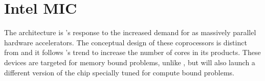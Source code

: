\documentclass[../thesis]{subfiles}
\begin{document}
	\chapter{Intel MIC}
	\label{chp:mic}

	The \mic architecture \cite{Intel:XeonPhi:DevGuide} is \intel's response to the increased demand for \gpgpus as massively parallel hardware accelerators. The conceptual design of these coprocessors is distinct from \gpgpus and it follows \intel's trend to increase the number of cores in its products. These devices are targeted for memory bound problems, unlike \gpus, but \intel will also launch a different version of the chip specially tuned for compute bound problems.

	
	
	
	
	
	
\end{document}
